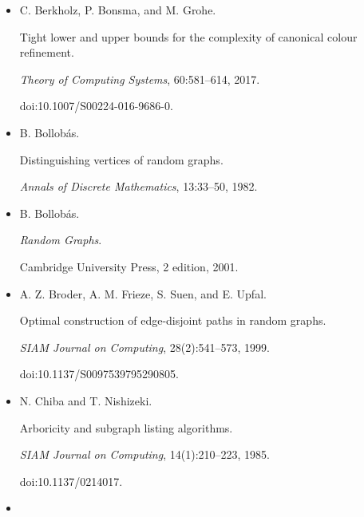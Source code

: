 \begin{itemize}
arXiv:2510.20765.





\item[] 
[12]

C. Berkholz, P. Bonsma, and M. Grohe.


Tight lower and upper bounds for the complexity of canonical colour
refinement.


\emph{Theory of Computing Systems}, 60:581–614, 2017.


doi:10.1007/S00224-016-9686-0.





\item[] 
[13]

B. Bollobás.


Distinguishing vertices of random graphs.


\emph{Annals of Discrete Mathematics}, 13:33–50, 1982.





\item[] 
[14]

B. Bollobás.


\emph{Random Graphs}.


Cambridge University Press, 2 edition, 2001.





\item[] 
[15]

A. Z. Broder, A. M. Frieze, S. Suen, and E. Upfal.


Optimal construction of edge-disjoint paths in random graphs.


\emph{SIAM Journal on Computing}, 28(2):541–573, 1999.


doi:10.1137/S0097539795290805.





\item[] 
[16]

N. Chiba and T. Nishizeki.


Arboricity and subgraph listing algorithms.


\emph{SIAM Journal on Computing}, 14(1):210–223, 1985.


doi:10.1137/0214017.





\item[] 
[17]


\end{itemize}
